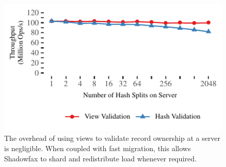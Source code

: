 \begin{figure}[t]
\centering
\includegraphics[width=0.9\columnwidth]{graphs/views.pdf}
\caption{The overhead of using views to validate record ownership
    at a server is negligible. When coupled with fast migration, this
    allows Shadowfax to shard and redistribute load whenever required.}
\label{fig:migration-views}
\end{figure}
